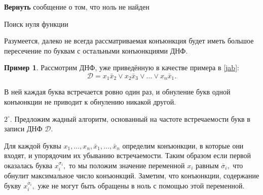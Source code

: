 \documentclass[12pt,a4paper,oneside,fleqn,leqno]{article}
\theoremstyle{definition}
\newtheorem{example}{Пример}%
\begin{document}
		\begin{algorithm}[H]
				\SetAlgoLined
				\textbf{Вернуть} сообщение о том, что ноль не найден\;
			\caption{Поиск нуля функции}
			\label{all_conj}
		\end{algorithm}\par
		Разумеется, далеко не всегда рассматриваемая конъюнкция будет иметь большое пересечение по буквам с остальными конъюнкциями ДНФ.\par
		\begin{example}
				Рассмотрим ДНФ, уже приведённую в качестве примера в \ref{jab}:
				$$
					\mathcal{D} = x_1\bar{x}_2 \vee x_2\bar{x}_3 \vee \ldots \vee x_n \bar{x}_1.
				$$\par
				В ней каждая буква встречается ровно один раз, и обнуление букв одной конъюнкции не приводит к обнулению никакой другой.
		\end{example}\par
		$2^{\circ}.$ Предложим жадный алгоритм, основанный на частоте встречаемости букв в записи ДНФ $\mathcal{D}.$\par
		Для каждой буквы $x_1,\ldots, x_n,\bar{x}_1,\ldots,\bar{x}_n$ определим конъюнкции, в которые они входят, и упорядочим их убыванию встречаемости. Таким образом если первой оказалась буква $x_i^{\sigma_i},$ то мы положим значение переменной $x_i$ равным $\bar{\sigma}_i,$ что обнулит максимальное число конъюнкций. Заметим, что конъюнкции, содержание букву $x_i^{\bar{\sigma}_i},$ уже не могут быть обращены в ноль с помощью этой переменной.\par
\end{document}
